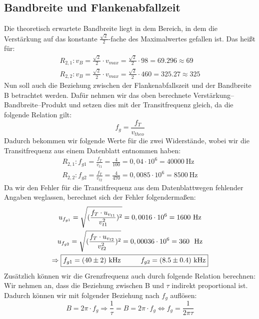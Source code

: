 \subsection*{Bandbreite und Flankenabfallzeit}
Die theoretisch erwartete Bandbreite liegt in dem Bereich, in dem die Verstärkung auf das konstante $\frac{\sqrt{2}}{2}$-fache des Maximalwertes gefallen ist. Das heißt für:
\begin{gather}
    R_{2,1}: v_B=\frac{\sqrt{2}}{2}\cdot v_{max}=\frac{\sqrt{2} }{2}\cdot 98=69.296\approx 69\\
    R_{2,2}: v_B=\frac{\sqrt{2}}{2}\cdot v_{max}=\frac{\sqrt{2}}{2}\cdot460 =325.27\approx 325
\end{gather}
Nun soll auch die Beziehung zwischen der Flankenabfallszeit und der Bandbreite B betrachtet werden. Dafür nehmen wir das oben berechnete Verstärkung–Bandbreite–Produkt und setzen dies mit der Transitfrequenz gleich, da die folgende Relation gilt:
\begin{equation}
    f_g=\frac{f_T}{v_{theo}}
\end{equation}
Dadurch bekommen wir folgende Werte für die zwei Widerstände, wobei wir die Transitfrequenz aus einem Datenblatt entnommen haben:
\begin{gather}
    R_{2,1}: f_{g1}=\frac{f_T}{v_{t1}}=\frac{4}{100}=0,04\cdot 10^6=40000~\text{Hz}\\
    R_{2,2}: f_{g2}=\frac{f_T}{v_{t2}}=\frac{4}{470}=0,0085\cdot 10^6=8500~\text{Hz}
\end{gather}
Da wir den Fehler für die Transitfrequenz aus dem Datenblatt\footnotemark[1] wegen fehlender Angaben weglassen, berechnet sich der Fehler folgendermaßen:
\begin{gather}
    u_{f_{g1}}=\sqrt{(\frac{f_T \cdot u_{v_{t1}}}{v_{t1}^2})^2}=0,0016\cdot 10^6=1600~\text{Hz}\\
    u_{f_{g2}}=\sqrt{(\frac{f_T \cdot u_{v_{t2}}}{v_{t2}^2})^2}=0,00036\cdot 10^6=360~~\text{Hz}\\
    \Rightarrow \boxed{f_{g1}=(40\pm2)~\text{kHz} \hspace*{1cm} f_{g2}=(8.5\pm0.4)~\text{kHz}}
\end{gather}
Zusätzlich können wir die Grenzfrequenz auch durch folgende Relation berechnen: Wir nehmen an, dass die Beziehung zwischen B und $\tau$ indirekt proportional ist. Dadurch können wir mit folgender Beziehung nach $f_g$ auflösen:
\begin{equation}
    B=2\pi\cdot f_g \Rightarrow \frac{1}{\tau}=B=2\pi\cdot f_g \Leftrightarrow  f_g=\frac{1}{2\pi \tau}
\end{equation}
